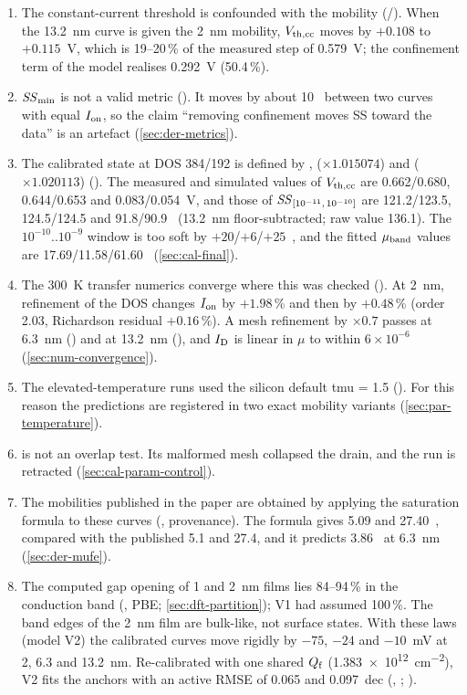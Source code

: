 \begin{enumerate}
  \item The constant-current threshold is confounded with the mobility (\evDATA/\evNUM). When the 13.2~nm curve is given the 2~nm mobility, $V_{\mathrm{th,cc}}$ moves by $+0.108$ to $+0.115$~V, which is 19--20\,\% of the measured step of 0.579~V; the confinement term of the model realises 0.292~V (50.4\,\%).
  \item $\mathit{SS}_{\min}$ is not a valid metric (\evNUM). It moves by about 10~\mVdec{} between two curves with equal $I_{\mathrm{on}}$, so the claim ``removing confinement moves SS toward the data'' is an artefact (\cref{sec:der-metrics}).
  \item The calibrated state at DOS 384/192 is defined by ,  ($\times1.015074$) and  ($\times1.020113$) (\evCAL). The measured and simulated values of $V_{\mathrm{th,cc}}$ are 0.662/0.680, 0.644/0.653 and 0.083/0.054~V, and those of $\mathit{SS}_{[10^{-11},\,10^{-10}]}$ are 121.2/123.5, 124.5/124.5 and 91.8/90.9~\mVdec{} (13.2~nm floor-subtracted; raw value 136.1). The $10^{-10}$..$10^{-9}$ window is too soft by $+20$/$+6$/$+25$~\mVdec, and the fitted $\mu_{\mathrm{band}}$ values are 17.69/11.58/61.60~\cmVs{} (\cref{sec:cal-final}).
  \item The 300~K transfer numerics converge where this was checked (\evNUM). At 2~nm, refinement of the DOS changes $I_{\mathrm{on}}$ by $+1.98$\,\% and then by $+0.48$\,\% (order 2.03, Richardson residual $+0.16$\,\%). A mesh refinement by $\times0.7$ passes at 6.3~nm () and at 13.2~nm (), and $I_{\mathrm{D}}$ is linear in $\mu$ to within $6\times10^{-6}$ (\cref{sec:num-convergence}).
  \item The elevated-temperature runs used the silicon default tmu = 1.5 (\evNUM). For this reason the predictions are registered in two exact mobility variants (\cref{sec:par-temperature}).
  \item {} is not an overlap test. Its malformed mesh collapsed the drain, and the run is retracted (\cref{sec:cal-param-control}).
  \item The mobilities published in the paper are obtained by applying the saturation formula to these curves (\evDATA, provenance). The formula gives 5.09 and 27.40~\cmVs, compared with the published 5.1 and 27.4, and it predicts 3.86~\cmVs{} at 6.3~nm (\cref{sec:der-mufe}).
  \item The computed gap opening of 1 and 2~nm \InO{} films lies 84--94\,\% in the conduction band (\evTHEORY, PBE; \cref{sec:dft-partition}); V1 had assumed 100\,\%. The band edges of the 2~nm film are bulk-like, not surface states. With these laws (model V2) the calibrated curves move rigidly by $-75$, $-24$ and $-10$~mV at 2, 6.3 and 13.2~nm. Re-calibrated with one shared $Q_{\mathrm{f}}$ (\SI{1.383e12}{cm^{-2}}), V2 fits the anchors with an active RMSE of 0.065 and 0.097~dec (, ; \evCAL).

\end{enumerate}
